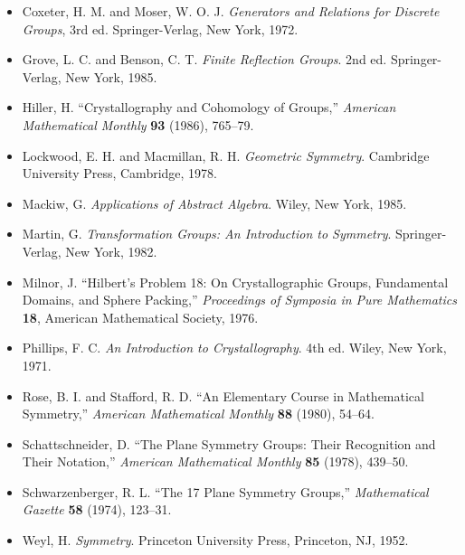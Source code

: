 {\small
\begin{itemize}
 
\item[{\bf [1]}]
Coxeter, H. M. and Moser, W. O. J. {\it Generators and
Relations for Discrete Groups}, 3rd ed. Springer-Verlag, New
York, 1972.
 
\item[{\bf [2]}]
Grove, L. C. and Benson, C. T. {\it Finite Reflection
Groups}. 2nd ed. Springer-Verlag, New York, 1985.
 
\item[{\bf [3]}]
Hiller, H. ``Crystallography and Cohomology of Groups,''
{\it American Mathematical Monthly} {\bf 93} (1986), 765--79.
 
\item[{\bf [4]}]
Lockwood, E. H. and Macmillan, R. H. {\it Geometric
Symmetry}. Cambridge University Press, Cambridge, 1978.
 
\item[{\bf [5]}]
Mackiw, G. {\it Applications of Abstract Algebra}. Wiley,
New York, 1985.
 
 
\item[{\bf [6]}]
Martin,  G.  {\it Transformation  Groups:  An Introduction to
Symmetry}.  Springer-Verlag, New York, 1982.
 
  
\item[{\bf [7]}]
Milnor, J. ``Hilbert's Problem 18: On Crystallographic
Groups, Fundamental Domains, and Sphere Packing,'' {\it
Proceedings of Symposia in Pure Mathematics} {\bf 18},
American Mathematical Society, 1976.
 
\item[{\bf [8]}]
Phillips, F. C. {\it An Introduction to Crystallography}.
4th ed. Wiley, New York, 1971.
 
\item[{\bf [9]}]
Rose, B. I. and Stafford, R. D. ``An Elementary Course in
Mathematical Symmetry,'' {\it American Mathematical Monthly} {\bf
88} (1980), 54--64.
 
 
\item[{\bf [10]}]
Schattschneider, D. ``The Plane Symmetry Groups: Their
Recognition and Their Notation,'' {\it American Mathematical 
Monthly} {\bf 85} (1978), 439--50.
 
 
\item[{\bf [11]}]
Schwarzenberger, R. L. ``The 17 Plane Symmetry Groups,'' {\it
Mathematical  Gazette} {\bf 58} (1974), 123--31. 
 
 
\item[{\bf [12]}]
Weyl, H. {\it Symmetry}. Princeton University Press, Princeton, NJ,
1952. 
 
 
\end{itemize}
}
 
 
 
 
